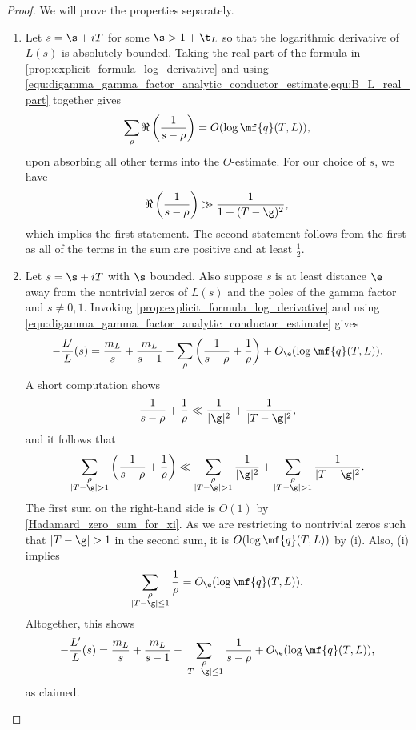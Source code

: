 \documentclass[12pt]{article}
\begin{document}
      \begin{proof}
        We will prove the properties separately.
        \begin{enumerate}[label*=(\roman*)]
          \item Let \(s = \s+iT\) for some \(\s > 1+\t_{L}\) so that the logarithmic derivative of \(L(s)\) is absolutely bounded. Taking the real part of the formula in \cref{prop:explicit_formula_log_derivative} and using \cref{equ:digamma_gamma_factor_analytic_conductor_estimate,equ:B_L_real_part} together gives
          \[
            \sum_{\rho}\Re\left(\frac{1}{s-\rho}\right) = O(\log{\mf{q}(T,L)}),
          \]
          upon absorbing all other terms into the \(O\)-estimate. For our choice of \(s\), we have
          \[
            \Re\left(\frac{1}{s-\rho}\right) \gg \frac{1}{1+(T-\g)^{2}},
          \]
          which implies the first statement. The second statement follows from the first as all of the terms in the sum are positive and at least \(\frac{1}{2}\).
          \item Let \(s = \s+iT\) with \(\s\) bounded. Also suppose \(s\) is at least distance \(\e\) away from the nontrivial zeros of \(L(s)\) and the poles of the gamma factor and \(s \neq 0,1\). Invoking \cref{prop:explicit_formula_log_derivative} and using \cref{equ:digamma_gamma_factor_analytic_conductor_estimate} gives
          \[
            -\frac{L'}{L}(s) = \frac{m_{L}}{s}+\frac{m_{L}}{s-1}-\sum_{\rho}\left(\frac{1}{s-\rho}+\frac{1}{\rho}\right)+O_{\e}(\log{\mf{q}(T,L)}).
          \]
          A short computation shows
          \[
            \frac{1}{s-\rho}+\frac{1}{\rho} \ll \frac{1}{|\g|^{2}}+\frac{1}{|T-\g|^{2}},
          \]
          and it follows that
          \[
            \sum_{\substack{\rho \\ |T-\g| > 1}}\left(\frac{1}{s-\rho}+\frac{1}{\rho}\right) \ll \sum_{\substack{\rho \\ |T-\g| > 1}}\frac{1}{|\g|^{2}}+\sum_{\substack{\rho \\ |T-\g| > 1}}\frac{1}{|T-\g|^{2}}.
          \]
          The first sum on the right-hand side is \(O(1)\) by \cref{Hadamard_zero_sum_for_xi}. As we are restricting to nontrivial zeros such that \(|T-\g| > 1\) in the second sum, it is \(O(\log{\mf{q}(T,L)})\) by (i). Also, (i) implies
          \[
            \sum_{\substack{\rho \\ |T-\g| \le 1}}\frac{1}{\rho} = O_{\e}(\log{\mf{q}(T,L)}).
          \]
          Altogether, this shows
          \[
            -\frac{L'}{L}(s) = \frac{m_{L}}{s}+\frac{m_{L}}{s-1}-\sum_{\substack{\rho \\ |T-\g| \le 1}}\frac{1}{s-\rho}+O_{\e}(\log{\mf{q}(T,L)}),
          \]
          as claimed.  
        \end{enumerate}
      \end{proof}
\end{document}
